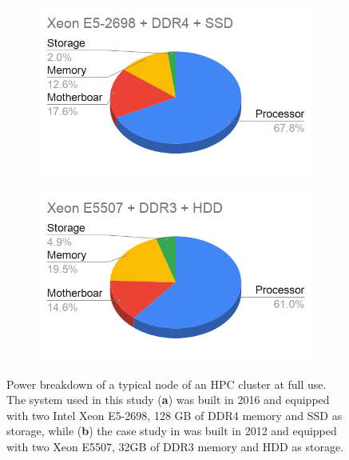 \begin{figure}[H]
	\centering
	\captionsetup[subfigure]{justification=centering}
	
	\begin{subfigure}[b]{0.45\textwidth}
		\includegraphics[width=\textwidth]{models/figures/power_breakdown/Xeon E5-2698 + DDR4 + SSD.png}
		\caption{}
		\label{fig:powerbreakdown_a}
	\end{subfigure}
	\begin{subfigure}[b]{0.45\textwidth}
		\includegraphics[width=\textwidth]{models/figures/power_breakdown/Xeon E5507 + DDR3 + HDD.png}
		\caption{}
		\label{fig:powerbreakdown_b}
	\end{subfigure}
	
	\hfill
	\caption{Power breakdown of a typical node of an HPC cluster at full use. The system used in this study (\textbf{a}) was built in 2016 and equipped with two Intel Xeon E5-2698, 128 GB of DDR4 memory and SSD as storage, while (\textbf{b}) the case study in \cite{Malladi2012TowardsDRAM} was built in 2012 and equipped with two Xeon E5507, 32GB of DDR3 memory and HDD as storage.}
	\label{fig:powerbreakdown}
\end{figure}

